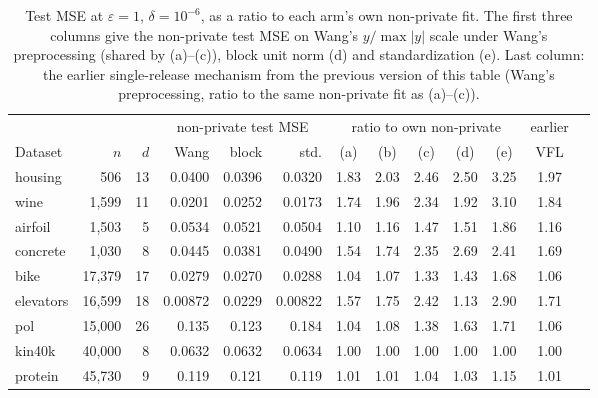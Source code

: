 \begin{table}[t]
  \centering
  \small
  \caption{Test MSE at $\varepsilon = 1$, $\delta = 10^{-6}$, as a ratio to each arm's own non-private fit. The first three columns give the non-private test MSE on Wang's $y/\max|y|$ scale under Wang's preprocessing (shared by (a)--(c)), block unit norm (d) and standardization (e). Last column: the earlier single-release mechanism from the previous version of this table (Wang's preprocessing, ratio to the same non-private fit as (a)--(c)).}
  \label{tab:adassp_v31}
  \setlength{\tabcolsep}{3.5pt}
  \begin{tabular}{@{}lrrrrrccccccc@{}}
    \toprule
    & & & \multicolumn{3}{c}{non-private test MSE} & \multicolumn{5}{c}{ratio to own non-private} & earlier \\
    \cmidrule(lr){4-6} \cmidrule(lr){7-11}
    Dataset & $n$ & $d$ & Wang & block & std. & (a) & (b) & (c) & (d) & (e) & VFL \\
    \midrule
    housing & 506 & 13 & 0.0400 & 0.0396 & 0.0320 & 1.83 & 2.03 & 2.46 & 2.50 & 3.25 & 1.97 \\
    wine & 1{,}599 & 11 & 0.0201 & 0.0252 & 0.0173 & 1.74 & 1.96 & 2.34 & 1.92 & 3.10 & 1.84 \\
    airfoil & 1{,}503 & 5 & 0.0534 & 0.0521 & 0.0504 & 1.10 & 1.16 & 1.47 & 1.51 & 1.86 & 1.16 \\
    concrete & 1{,}030 & 8 & 0.0445 & 0.0381 & 0.0490 & 1.54 & 1.74 & 2.35 & 2.69 & 2.41 & 1.69 \\
    bike & 17{,}379 & 17 & 0.0279 & 0.0270 & 0.0288 & 1.04 & 1.07 & 1.33 & 1.43 & 1.68 & 1.06 \\
    elevators & 16{,}599 & 18 & 0.00872 & 0.0229 & 0.00822 & 1.57 & 1.75 & 2.42 & 1.13 & 2.90 & 1.71 \\
    pol & 15{,}000 & 26 & 0.135 & 0.123 & 0.184 & 1.04 & 1.08 & 1.38 & 1.63 & 1.71 & 1.06 \\
    kin40k & 40{,}000 & 8 & 0.0632 & 0.0632 & 0.0634 & 1.00 & 1.00 & 1.00 & 1.00 & 1.00 & 1.00 \\
    protein & 45{,}730 & 9 & 0.119 & 0.121 & 0.119 & 1.01 & 1.01 & 1.04 & 1.03 & 1.15 & 1.01 \\
    \bottomrule
  \end{tabular}
\end{table}

